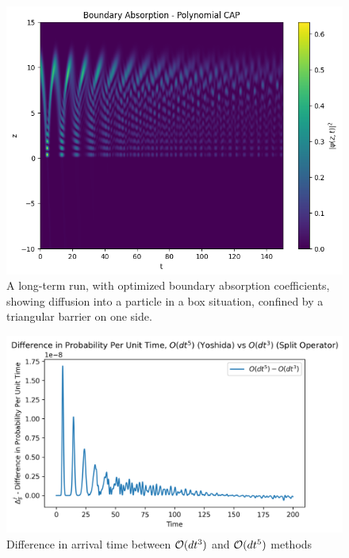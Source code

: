 \begin{figure}
    \centering
    \includegraphics[width=1\linewidth]{Figures//1d_arrival_time/longterm-behaviour.png}
    \caption{A long-term run, with optimized boundary absorption coefficients, showing diffusion into a particle in a box situation, confined by a triangular barrier on one side.}
    \label{fig:long-term-run}
\end{figure}

\begin{figure}
    \centering
    \includegraphics[width=1\linewidth]{Figures//Yoshida/ba79e062-ec65-4942-8011-72ec13c391e6.png}
    \caption{Difference in arrival time between $\mathcal{O}(dt^3)$ and $\mathcal{O}(dt^5)$ methods}
    \label{fig:difference_dt3dt5}
\end{figure}


